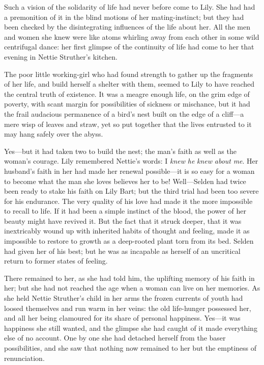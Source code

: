 \documentclass[12pt,a4paper]{book}
\begin{document}
Such a vision of the solidarity of life had never before come to
Lily. She had had a premonition of it in the blind motions of her
mating-instinct; but they had been checked by the disintegrating
influences of the life about her. All the men and women she knew
were like atoms whirling away from each other in some wild
centrifugal dance: her first glimpse of the continuity of life
had come to her that evening in Nettie Struther's kitchen.





The poor little working-girl who had found strength to gather up
the fragments of her life, and build herself a shelter with them,
seemed to Lily to have reached the central truth of existence. It
was a meagre enough life, on the grim edge of poverty, with scant
margin for possibilities of sickness or mischance, but it had the
frail audacious permanence of a bird's nest built on the edge of
a cliff---a mere wisp of leaves and straw, yet so put together
that the lives entrusted to it may hang safely over the abyss.





Yes---but it had taken two to build the nest; the man's faith as
well as the woman's courage. Lily remembered Nettie's words: I
\textit{knew} \textit{he} \textit{knew} \textit{about} \textit{me}. Her husband's faith in her had made her
renewal possible---it is so easy for a woman to become what the
man she loves believes her to be! Well---Selden had twice been
ready to stake his faith on Lily Bart; but the third trial had
been too severe for his endurance. The very quality of his love
had made it the more impossible to recall to life. If it had been
a simple instinct of the blood, the power of her beauty might
have revived it. But the fact that it struck deeper, that it was
inextricably wound up with inherited habits of thought and
feeling, made it as impossible to restore to growth as a
deep-rooted plant torn from its bed. Selden had given her of his
best; but he was as incapable as herself of an uncritical return
to former states of feeling.





There remained to her, as she had told him, the uplifting memory
of his faith in her; but she had not reached the age when a woman
can live on her memories. As she held Nettie Struther's
child in her arms the frozen currents of youth had loosed
themselves and run warm in her veins: the old life-hunger
possessed her, and all her being clamoured for its share of
personal happiness. Yes---it was happiness she still wanted, and
the glimpse she had caught of it made everything else of no
account. One by one she had detached herself from the baser
possibilities, and she saw that nothing now remained to her but
the emptiness of renunciation.
\end{document}
